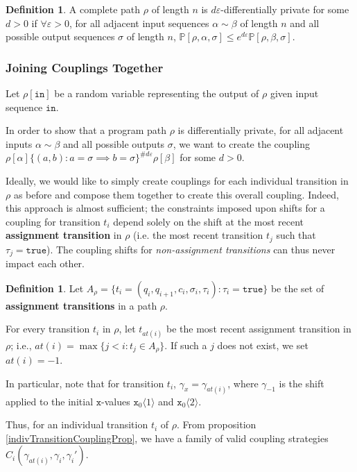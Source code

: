 \documentclass[12pt]{article}
\newcommand{\PP}{\mathbb{P}}
\newcommand{\brangle}[1]{\langle #1 \rangle}
\theoremstyle{definition}
\newtheorem{defn}[thm]{Definition}
\begin{document}
\begin{defn}
    A complete path $\rho$ of length $n$ is $d\varepsilon$-differentially private for some $d>0$ if $\forall \varepsilon>0$, for all adjacent input sequences $\alpha\sim \beta$ of length $n$ and all possible output sequences $\sigma$ of length $n$, $\PP[\rho, \alpha, \sigma]\leq e^{d\varepsilon}\PP[\rho, \beta, \sigma]$.
\end{defn}

\subsubsection{Joining Couplings Together}

Let $\rho[\texttt{in}]$ be a random variable representing the output of $\rho$ given input sequence $\texttt{in}$. 

In order to show that a program path $\rho$ is differentially private, for all adjacent inputs $\alpha\sim\beta$ and all possible outputs $\sigma$, we want to create the coupling $\rho[\alpha]\{(a, b): a=\sigma\implies b=\sigma\}^{\#d\varepsilon}\rho[\beta]$ for some $d>0$. 

Ideally, we would like to simply create couplings for each individual transition in $\rho$ as before and compose them together to create this overall coupling. Indeed, this approach is almost sufficient; the constraints imposed upon shifts for a coupling for transition $t_i$ depend solely on the shift at the most recent \textbf{assignment transition} in $\rho$ (i.e. the most recent transition $t_j$ such that $\tau_j = \texttt{true}$). 
The coupling shifts for \textit{non-assignment transitions} can thus never impact each other. 

\begin{defn}
    Let $A_\rho = \{t_i=(q_i, q_{i+1}, c_i, \sigma_i, \tau_i): \tau_i = \texttt{true}\}$ be the set of \textbf{assignment transitions} in a path $\rho$. 

    For every transition $t_i$ in $\rho$, let $t_{at(i)}$ be the most recent assignment transition in $\rho$; i.e., $at(i) = \max\{j<i: t_j\in A_\rho\}$. If such a $j$ does not exist, we set $at(i)=-1$. 
\end{defn}

In particular, note that for transition $t_i$, $\gamma_x = \gamma_{at(i)}$, where $\gamma_{-1}$ is the shift applied to the initial $\texttt{x}$-values $\texttt{x}_0\brangle{1}$ and $\texttt{x}_0\brangle{2}$.

Thus, for an individual transition $t_i$ of $\rho$. From proposition \ref{indivTransitionCouplingProp}, we have a family of valid coupling strategies $C_i(\gamma_{at(i)}, \gamma_i, \gamma_i')$. 
\end{document}
